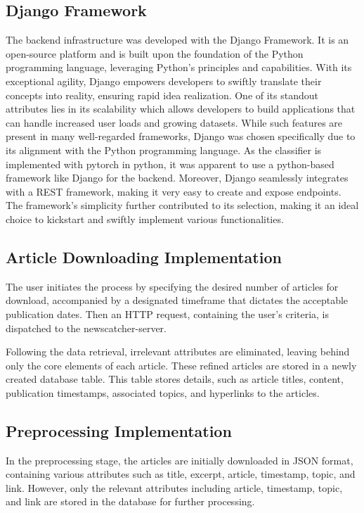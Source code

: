\documentclass[a4paper,10pt]{report} %
\begin{document}
\subsection{Django Framework}
The backend infrastructure was developed with the Django Framework. It is an open-source platform and is built upon the foundation of the Python programming language, leveraging Python's principles and capabilities. With its exceptional agility, Django empowers developers to swiftly translate their concepts into reality, ensuring rapid idea realization. One of its standout attributes lies in its scalability which allows developers to build applications that can handle increased user loads and growing datasets. While such features are present in many well-regarded frameworks, Django was chosen specifically due to its alignment with the Python programming language. As the classifier is implemented with pytorch in python, it was apparent to use a python-based framework like Django for the backend. Moreover, Django seamlessly integrates with a REST framework, making it very easy to create and expose endpoints. The framework's simplicity further contributed to its selection, making it an ideal choice to kickstart and swiftly implement various functionalities.

\subsection{Article Downloading Implementation}
The user initiates the process by specifying the desired number of articles for download, accompanied by a designated timeframe that dictates the acceptable publication dates. Then an HTTP request, containing the user's criteria, is dispatched to the newscatcher-server.

Following the data retrieval, irrelevant attributes are eliminated, leaving behind only the core elements of each article. These refined articles are stored in a newly created database table. This table stores details, such as article titles, content, publication timestamps, associated topics, and hyperlinks to the articles.

\subsection{Preprocessing Implementation}
In the preprocessing stage, the articles are initially downloaded in JSON format, containing various attributes such as title, excerpt, article, timestamp, topic, and link. However, only the relevant attributes including article, timestamp, topic, and link are stored in the database for further processing.
\end{document}
